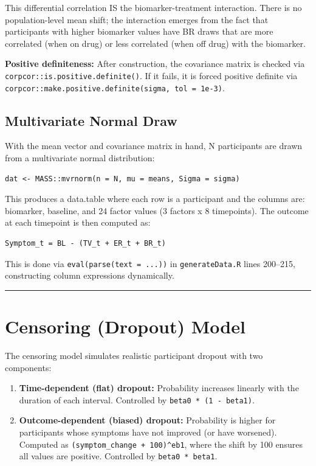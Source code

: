 \documentclass[11pt]{article}
\begin{document}
This differential correlation IS the biomarker-treatment
interaction. There is no population-level mean shift; the
interaction emerges from the fact that participants with higher
biomarker values have BR draws that are more correlated (when on
drug) or less correlated (when off drug) with the biomarker.

\textbf{Positive definiteness:} After construction, the covariance
matrix is checked via \texttt{corpcor::is.positive.definite()}. If it
fails, it is forced positive definite via
\texttt{corpcor::make.positive.definite(sigma, tol = 1e-3)}.

\subsection{Multivariate Normal Draw}

With the mean vector and covariance matrix in hand, N
participants are drawn from a multivariate normal distribution:

\begin{lstlisting}
dat <- MASS::mvrnorm(n = N, mu = means, Sigma = sigma)
\end{lstlisting}

This produces a data.table where each row is a participant and
the columns are: biomarker, baseline, and 24 factor values
(3 factors x 8 timepoints). The outcome at each timepoint is
then computed as:

\begin{verbatim}
Symptom_t = BL - (TV_t + ER_t + BR_t)
\end{verbatim}

This is done via \texttt{eval(parse(text = ...))} in \texttt{generateData.R}
lines 200--215, constructing column expressions dynamically.

\bigskip\noindent\rule{\textwidth}{0.4pt}\bigskip

\section{Censoring (Dropout) Model}

The censoring model simulates realistic participant dropout
with two components:

\begin{enumerate}
  \item \textbf{Time-dependent (flat) dropout:} Probability increases
    linearly with the duration of each interval. Controlled
    by \texttt{beta0 * (1 - beta1)}.
  \item \textbf{Outcome-dependent (biased) dropout:} Probability is
    higher for participants whose symptoms have not improved
    (or have worsened). Computed as \texttt{(symptom\_change + 100)\^{}eb1},
    where the shift by 100 ensures all values are positive.
    Controlled by \texttt{beta0 * beta1}.
\end{enumerate}
\end{document}
